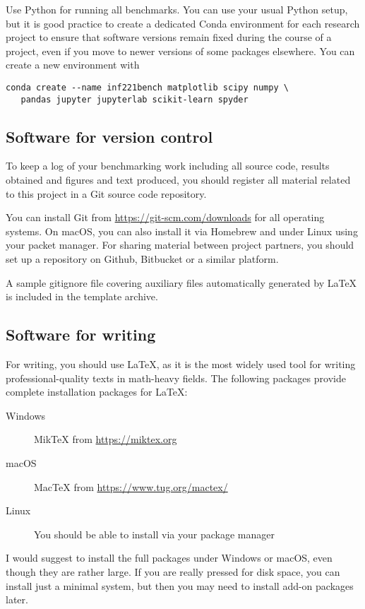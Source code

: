 \documentclass[sigconf, nonacm, natbib, screen, balance=False]{acmart}
\begin{document}
Use Python for running all benchmarks. You can use your usual Python
setup, but it is good practice to create a dedicated Conda environment
for each research project to ensure that software versions remain
fixed during the course of a project, even if you move to newer
versions of some packages elsewhere. You can create a new environment
with
\begin{verbatim}
conda create --name inf221bench matplotlib scipy numpy \
   pandas jupyter jupyterlab scikit-learn spyder
\end{verbatim}


\subsection{Software for version control}\label{sec:swvc}
To keep a log of your benchmarking work including all source code,
results obtained and figures and text produced, you should register
all material related to this project in a Git source code repository.

You can install Git from \url{https://git-scm.com/downloads} for all
operating systems. On macOS, you can also install it via Homebrew and
under Linux using your packet manager. For sharing material between
project partners, you should set up a repository on Github, Bitbucket
or a similar platform.

A sample gitignore file covering auxiliary files automatically
generated by \LaTeX{} is included in the template archive.

\subsection{Software for writing}\label{sec:swtex}

For writing, you should use \LaTeX, as it is the most widely used tool
for writing professional-quality texts in math-heavy fields. The
following packages provide complete installation packages for
\LaTeX:

\begin{description}
\item[Windows] MikTeX from \url{https://miktex.org}
\item[macOS] MacTeX from \url{https://www.tug.org/mactex/}
\item[Linux] You should be able to install via your package manager
\end{description}
  
I would suggest to install the full packages under Windows or macOS,
even though they are rather large. If you are really pressed for disk
space, you can install just a minimal system, but then you may need to
install add-on packages later.
\end{document}
